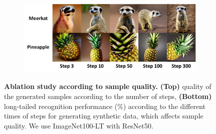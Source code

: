 \begin{figure}[t]
    \begin{subfigure}[c]{0.9\linewidth}
        \centering
        \includegraphics[width=1.0\linewidth]{figures/stepqual_vis.pdf}
    \end{subfigure}
    \centering
    \begin{subtable}[c]{0.9\linewidth}
    \end{subtable}
\caption{\textbf{Ablation study according to sample quality.}
\textbf{(Top)} quality of the generated samples according to the number of steps, \textbf{(Bottom)} long-tailed recognition performance (\%) 
according to the different times of steps for generating synthetic data, which affects sample quality.
We use ImageNet100-LT with ResNet50.
}
\label{fig:imagenet100_lt}
\end{figure}








